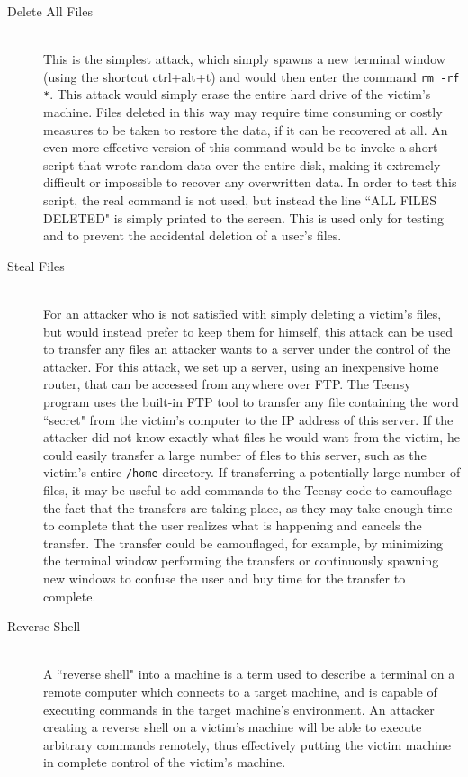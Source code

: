 \documentclass[pagenumbers]{ieee}
\begin{document}
\begin{description}
\item[Delete All Files] \hfill \\
This is the simplest attack, which simply spawns a new terminal window (using the shortcut ctrl+alt+t) and would then enter the command \texttt{rm -rf *}. This attack would simply erase the entire hard drive of the victim's machine. Files deleted in this way may require time consuming or costly measures to be taken to restore the data, if it can be recovered at all. An even more effective version of this command would be to invoke a short script that wrote random data over the entire disk, making it extremely difficult or impossible to recover any overwritten data. In order to test this script, the real command is not used, but instead the line ``ALL FILES DELETED" is simply printed to the screen. This is used only for testing and to prevent the accidental deletion of a user's files. 

\item[Steal Files] \hfill \\
For an attacker who is not satisfied with simply deleting a victim's files, but would instead prefer to keep them for himself, this attack can be used to transfer any files an attacker wants to a server under the control of the attacker. For this attack, we set up a server, using an inexpensive home router, that can be accessed from anywhere over FTP. The Teensy program uses the built-in FTP tool to transfer any file containing the word ``secret" from the victim's computer to the IP address of this server.  If the attacker did not know exactly what files he would want from the victim, he could easily transfer a large number of files to this server, such as the victim's entire \texttt{/home} directory. If transferring a potentially large number of files, it may be useful to add commands to the Teensy code to camouflage the fact that the transfers are taking place, as they may take enough time to complete that the user realizes what is happening and cancels the transfer. The transfer could be camouflaged, for example, by minimizing the terminal window performing the transfers or continuously spawning new windows to confuse the user and buy time for the transfer to complete.

\item[Reverse Shell] \hfill \\
A ``reverse shell" into a machine is a term used to describe a terminal on a remote computer which connects to a target machine, and is capable of executing commands in the target machine's environment. An attacker creating a reverse shell on a victim's machine will be able to execute arbitrary commands remotely, thus effectively putting the victim machine in complete control of the victim's machine. 


\end{description}
\end{document}
